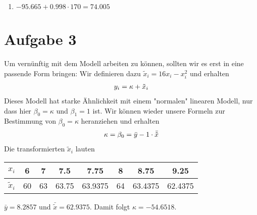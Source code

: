 \documentclass{article}
\begin{document}
\begin{enumerate}[label=(\alph*)]
\begin{center}
		\end{center}
		\item $-95.665 + 0.998 \cdot 170 = 74.005$
	\end{enumerate}

	\section*{Aufgabe 3}
	Um vernünftig mit dem Modell arbeiten zu können, sollten wir es erst in eine passende Form bringen: Wir definieren dazu $\tilde{x}_i = 16x_i - x_i^2$ und erhalten
	\begin{align}
		y_i = \kappa + \tilde{x}_i \notag
	\end{align}
	Dieses Modell hat starke Ähnlichkeit mit einem "normalen" linearen Modell, nur dass hier $\beta_0 = \kappa$ und $\beta_1=1$ ist. Wir können wieder unsere Formeln zur Bestimmung von $\beta_0=\kappa$ heranziehen und erhalten
	\begin{align}
		\kappa = \beta_0 = \bar{y} - 1\cdot\bar{\tilde{x}} \notag
	\end{align}
	Die transformierten $\tilde{x}_i$ lauten
	\begin{center}
		\begin{tabular}{c|ccccccc}
			$x_i$ & 6 & 7 & 7.5 & 7.75 & 8 & 8.75 & 9.25 \\
			\hline
			$\tilde{x}_i$ & 60 & 63 & 63.75 & 63.9375 & 64 & 63.4375 & 62.4375
		\end{tabular}
	\end{center}
	$\bar{y} = 8.2857$ und $\bar{\tilde{x}} = 62.9375$. Damit folgt $\kappa = -54.6518$.
\end{document}
